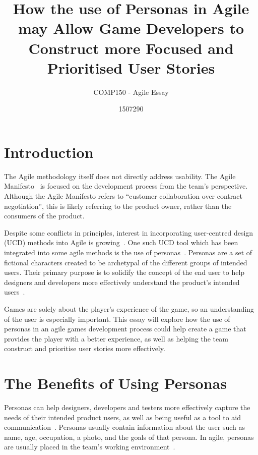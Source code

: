 \documentclass{scrartcl}
\title{How the use of Personas in Agile may Allow Game Developers to Construct more Focused and Prioritised User Stories}
\subtitle{COMP150 - Agile Essay}
\author{1507290}
\begin{document}
\maketitle


\section{Introduction}
The Agile methodology itself does not directly address usability. The Agile Manifesto~\cite{manifesto} is focused on the development process from the team's perspective. Although the Agile Manifesto refers to ``customer collaboration over contract negotiation'', this is likely referring to the product owner, rather than the consumers of the product. 

Despite some conflicts in principles, interest in incorporating user-centred design (UCD) methods into Agile is growing~\cite{haikara:extending}. One such UCD tool which has been integrated into some agile methods is the use of personas~\cite{caballero:persona}. Personas are a set of fictional characters created to be archetypal of the different groups of intended users. Their primary purpose is to solidify the concept of the end user to help designers and developers more effectively understand the product's intended users~\cite{cooper:face}. 

Games are solely about the player's experience of the game, so an understanding of the user is especially important. This essay will explore how the use of personas in an agile games development process could help create a game that provides the player with a better experience, as well as helping the team construct and prioritise user stories more effectively.

\section{The Benefits of Using Personas}
Personas can help designers, developers and testers more effectively capture the needs of their intended product users, as well as being useful as a tool to aid communication~\cite{choma:usability}. Personas usually contain information about the user such as name, age, occupation, a photo, and the goals of that persona. In agile, personas are usually placed in the team's working environment~\cite{alliance}. 
\end{document}

